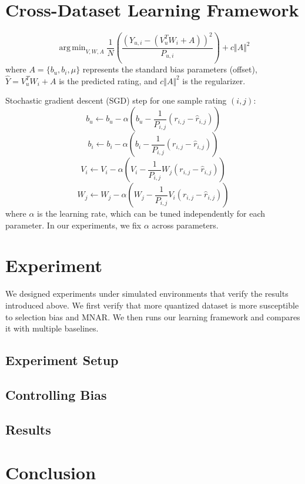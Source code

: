 \documentclass{article}
\DeclareMathOperator*{\argmin}{arg\,min}
\begin{document}
\section{Cross-Dataset Learning Framework}

\[ \argmin_{V,W,A} \frac{1}{N}\left(\frac{(Y_{u,i}- (V_u^TW_i + A))^2}{P_{u,i}} \right) + c \Vert A \Vert^2\]
where $A = \{ b_u, b_i, \mu \}$ represents the standard bias parameters (offset), $\hat{Y} = V_u^TW_i + A$ is the predicted rating, and $c \Vert A \Vert^2$ is the regularizer.

Stochastic gradient descent (SGD) step for one sample rating $(i,j)$:
\[ b_u \gets b_u - \alpha(b_u - \frac{1}{P_{i,j}}(r_{i,j} - \hat{r}_{i,j})) \]
\[ b_i \gets b_i - \alpha(b_i - \frac{1}{P_{i,j}}(r_{i,j} - \hat{r}_{i,j})) \]
\[ V_i \gets V_i - \alpha(V_i - \frac{1}{P_{i,j}}W_j(r_{i,j} - \hat{r}_{i,j})) \]
\[ W_j \gets W_j - \alpha(W_j - \frac{1}{P_{i,j}}V_i(r_{i,j} - \hat{r}_{i,j})) \]
where $\alpha$ is the learning rate, which can be tuned independently for each parameter. In our experiments, we fix $\alpha$ across parameters.

\section{Experiment}
We designed experiments under simulated environments that verify the results introduced above. We first verify that more quantized dataset is more susceptible to selection bias and MNAR. We then runs our learning framework and compares it with multiple baselines.

\subsection{Experiment Setup}

\subsection{Controlling Bias}

\subsection{Results}

\section{Conclusion}
\end{document}
